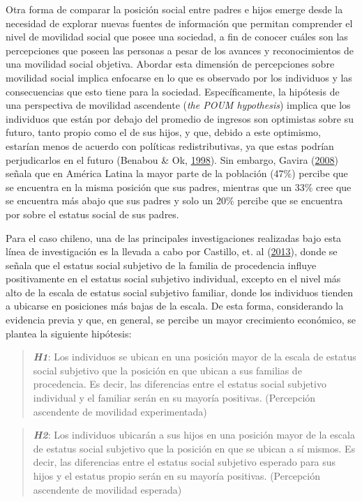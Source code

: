 \documentclass[
]{article}
\begin{document}
Otra forma de comparar la posición social entre padres e hijos emerge
desde la necesidad de explorar nuevas fuentes de información que
permitan comprender el nivel de movilidad social que posee una sociedad,
a fin de conocer cuáles son las percepciones que poseen las personas a
pesar de los avances y reconocimientos de una movilidad social objetiva.
Abordar esta dimensión de percepciones sobre movilidad social implica
enfocarse en lo que es observado por los individuos y las consecuencias
que esto tiene para la sociedad. Específicamente, la hipótesis de una
perspectiva de movilidad ascendente (\emph{the POUM hypothesis}) implica
que los individuos que están por debajo del promedio de ingresos son
optimistas sobre su futuro, tanto propio como el de sus hijos, y que,
debido a este optimismo, estarían menos de acuerdo con políticas
redistributivas, ya que estas podrían perjudicarlos en el futuro
(Benabou \& Ok, \protect\hyperlink{ref-benabou_Social_1998}{1998}). Sin
embargo, Gavira (\protect\hyperlink{ref-gavira_Social_2008}{2008})
señala que en América Latina la mayor parte de la población (47\%)
percibe que se encuentra en la misma posición que sus padres, mientras
que un 33\% cree que se encuentra más abajo que sus padres y solo un
20\% percibe que se encuentra por sobre el estatus social de sus padres.

Para el caso chileno, una de las principales investigaciones realizadas
bajo esta línea de investigación es la llevada a cabo por Castillo, et.
al (\protect\hyperlink{ref-castillo_Todos_2013}{2013}), donde se señala
que el estatus social subjetivo de la familia de procedencia influye
positivamente en el estatus social subjetivo individual, excepto en el
nivel más alto de la escala de estatus social subjetivo familiar, donde
los individuos tienden a ubicarse en posiciones más bajas de la escala.
De esta forma, considerando la evidencia previa y que, en general, se
percibe un mayor crecimiento económico, se plantea la siguiente
hipótesis:

\begin{quote}
\textbf{\emph{H1}}: Los individuos se ubican en una posición mayor de la
escala de estatus social subjetivo que la posición en que ubican a sus
familias de procedencia. Es decir, las diferencias entre el estatus
social subjetivo individual y el familiar serán en su mayoría positivas.
(Percepción ascendente de movilidad experimentada)
\end{quote}

\begin{quote}
\textbf{\emph{H2}}: Los individuos ubicarán a sus hijos en una posición
mayor de la escala de estatus social subjetivo que la posición en que se
ubican a sí mismos. Es decir, las diferencias entre el estatus social
subjetivo esperado para sus hijos y el estatus propio serán en su
mayoría positivas. (Percepción ascendente de movilidad esperada)
\end{quote}
\end{document}
